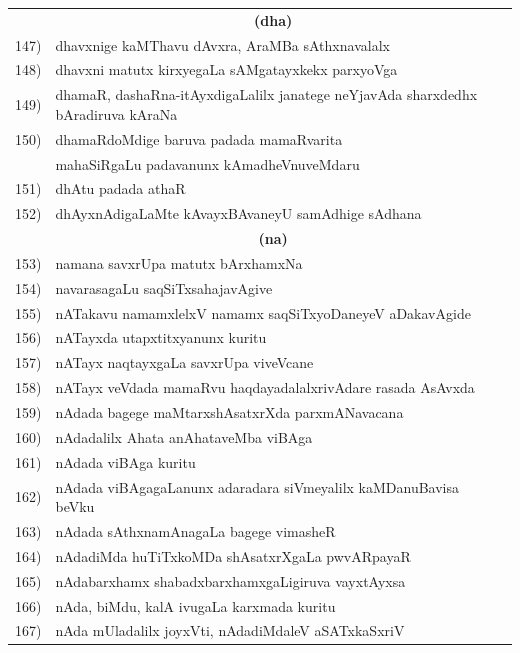 \begin{longtable}{@{}cp{7.4cm}r}
     &    \multicolumn{1}{c}{\textbf{(dha)}}  & \\[0.3cm] 
147) & dhavxnige kaMThavu dAvxra, AraMBa sAthxnavalalx & \pageref{page171a}\\
148) & dhavxni matutx kirxyegaLa sAMgatayxkekx parxyoVga & \pageref{page120}\\
149) & dhamaR, dashaRna-itAyxdigaLalilx janatege neYjavAda sharxdedhx bAradiruva kAraNa & \pageref{page50}\\
150) & dhamaRdoMdige baruva padada mamaRvarita  & \\
     & mahaSiRgaLu padavanunx kAmadheVnuveMdaru & \pageref{page205}\\
151) & dhAtu padada athaR & \pageref{page1} \\
152) & dhAyxnAdigaLaMte kAvayxBAvaneyU samAdhige sAdhana & \pageref{page231b}\\[0.3cm]
     &    \multicolumn{1}{c}{\textbf{(na)}}  & \\[0.3cm] 
153) & namana savxrUpa matutx bArxhamxNa & \pageref{page84a}\\
154) & navarasagaLu saqSiTxsahajavAgive & \pageref{page222a}\\
155) & nATakavu namamxlelxV namamx saqSiTxyoDaneyeV aDakavAgide & \pageref{page242a}\\
156) & nATayxda utapxtitxyanunx kuritu & \pageref{page242}\\
157) & nATayx naqtayxgaLa savxrUpa viveVcane &  \pageref{page241a}\\
158) & nATayx veVdada mamaRvu haqdayadalalxrivAdare rasada AsAvxda & \pageref{page244}\\
159) & nAdada bagege maMtarxshAsatxrXda parxmANavacana & \pageref{page159}\\
160) & nAdadalilx Ahata anAhataveMba viBAga & \pageref{page164}\\
161) & nAdada viBAga kuritu & \pageref{page158a}\\
162) & nAdada viBAgagaLanunx adaradara siVmeyalilx kaMDanuBavisa beVku & \pageref{page173}\\
163) & nAdada sAthxnamAnagaLa bagege vimasheR & \pageref{page158b}\\
164) & nAdadiMda huTiTxkoMDa shAsatxrXgaLa pwvARpayaR & \pageref{page175}\\
165) & nAdabarxhamx shabadxbarxhamxgaLigiruva vayxtAyxsa & \pageref{page160}\\
166) & nAda, biMdu, kalA ivugaLa karxmada kuritu & \pageref{page177}\\
167) & nAda mUladalilx joyxVti, nAdadiMdaleV aSATxkaSxriV & \pageref{page172}\\

\end{longtable}
